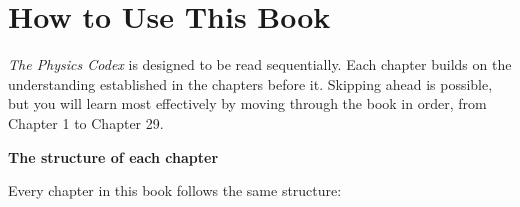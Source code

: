
\chapter*{How to Use This Book}

\textit{The Physics Codex} is designed to be read sequentially.
Each chapter builds on the understanding established in the
chapters before it. Skipping ahead is possible, but you will
learn most effectively by moving through the book in order,
from Chapter 1 to Chapter 29.

\vspace{0.5cm}
\textbf{The structure of each chapter}
\vspace{0.3cm}

Every chapter in this book follows the same structure:

